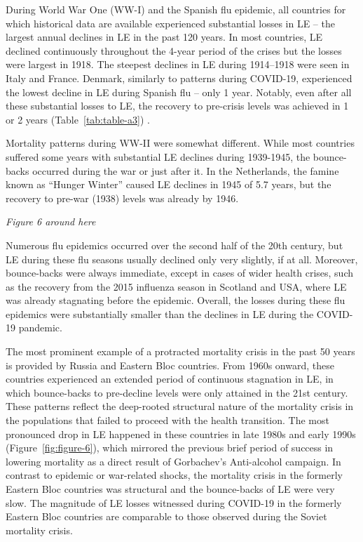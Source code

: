 \documentclass[12pt]{article}
\begin{document}
During World War One (WW-I) and the Spanish flu epidemic, all countries for which historical data are available experienced substantial losses in LE -- the largest annual declines in LE in the past 120 years. In most countries, LE declined continuously throughout the 4-year period of the crises but the losses were largest in 1918. The steepest declines in LE during 1914--1918 were seen in Italy and France. Denmark, similarly to patterns during COVID-19, experienced the lowest decline in LE during Spanish flu -- only 1 year. Notably, even after all these substantial losses to LE, the recovery to pre-crisis levels was achieved in 1 or 2 years (Table~\ref{tab:table-a3}) .

Mortality patterns during WW-II were somewhat different. While most countries suffered some years with substantial LE declines during 1939-1945, the bounce-backs occurred during the war or just after it. In the Netherlands, the famine known as ``Hunger Winter'' caused LE declines in 1945 of 5.7 years, but the recovery to pre-war (1938) levels was already  by 1946.\cite{Lumey1994}

\par\medskip
\emph{Figure 6 around here}
\par\medskip

Numerous flu epidemics occurred over the second half of the 20th century, but  LE during these flu seasons usually declined only very slightly, if at all. Moreover, bounce-backs were always immediate, except in cases of wider health crises, such as the recovery from the 2015 influenza season in Scotland and USA, where LE was already stagnating before the epidemic\cite{Fenton2019}. Overall, the losses during these flu epidemics were substantially smaller than the declines in LE during the COVID-19 pandemic.

The most prominent example of a protracted mortality crisis in the past 50 years is provided by Russia and Eastern Bloc countries. From 1960s onward, these countries experienced an extended period of continuous stagnation in LE, in which bounce-backs to pre-decline levels were only attained in the 21st century.\cite{Shkolnikov2013} These patterns reflect the deep-rooted structural nature of the mortality crisis in the populations that failed to proceed with the health transition.\cite{Timonin2016} The most pronounced drop in LE happened in these countries in late 1980s and early 1990s (Figure~\ref{fig:figure-6}), which mirrored the previous brief period of success in lowering mortality\cite{Zakharov1999} as a direct result of Gorbachev's Anti-alcohol campaign.\cite{Leon2009} In contrast to epidemic or war-related shocks, the mortality crisis in the formerly Eastern Bloc countries was structural and the bounce-backs of LE were very slow. The magnitude of LE losses witnessed during COVID-19 in the formerly Eastern Bloc countries are comparable to those observed during the Soviet mortality crisis.
\end{document}
